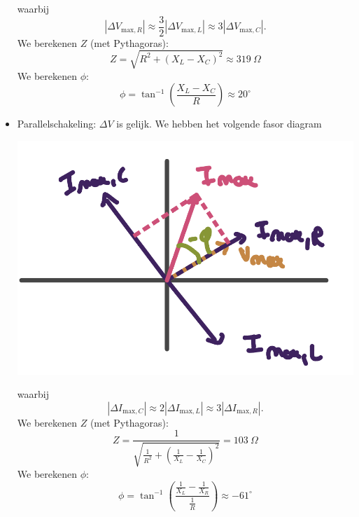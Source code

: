\begin{description}[labelwidth=1.5cm, leftmargin=!]
\begin{itemize}
\begin{center}
                \end{center}
                waarbij 
                \begin{equation*}
                    |\Delta V_{\text{max},R}| \approx \frac{3}{2}|\Delta V_{\text{max},L}| \approx 3|\Delta V_{\text{max},C}|.
                \end{equation*}
                We berekenen $Z$ (met Pythagoras):
                \begin{equation*}
                    Z = \sqrt{R^2 + (X_L - X_C)^2} \approx 319 \ \Omega
                \end{equation*}
                We berekenen $\phi$:
                \begin{equation*}
                    \phi = \tan^{-1}\left(\frac{X_L - X_C}{R}\right) \approx 20^\circ
                \end{equation*}
  
            \item Parallelschakeling: $\Delta V$ is gelijk. We hebben het volgende fasor diagram
                \begin{center}
                    \includegraphics[scale=0.3]{oz09/resources/Oz9Oef1-parallel.png}
                \end{center}
                waarbij
                \begin{equation*}
                    |\Delta I_{\text{max},C}| \approx 2|\Delta I_{\text{max},L}| \approx 3|\Delta I_{\text{max},R}|.
                \end{equation*}
                We berekenen $Z$ (met Pythagoras):
                \begin{equation*}
                    Z = \frac{1}{\sqrt{\frac{1}{R^2} + \left(\frac{1}{X_L} - \frac{1}{X_C}\right)^2}} = 103 \ \Omega
                \end{equation*}
                We berekenen $\phi$:
                \begin{equation*}
                    \phi = \tan^{-1}\left(\frac{\frac{1}{X_L} - \frac{1}{X_R}}{\frac{1}{R}}\right) \approx -61^\circ
                \end{equation*}
        \end{itemize}
\end{description}

\vspace{1cm}